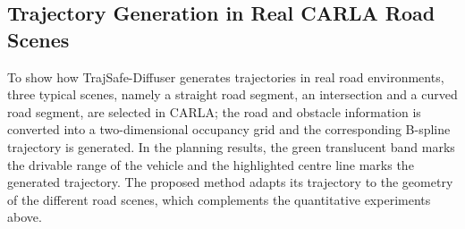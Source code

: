 \documentclass[journal]{IEEEtran}
\begin{document}
\subsection{Trajectory Generation in Real CARLA Road Scenes}
To show how TrajSafe-Diffuser generates trajectories in real road environments,
three typical scenes, namely a straight road segment, an intersection and a
curved road segment, are selected in CARLA; the road and obstacle information is
converted into a two-dimensional occupancy grid and the corresponding B-spline
trajectory is generated. In the planning results, the green translucent band
marks the drivable range of the vehicle and the highlighted centre line marks the
generated trajectory. The proposed method adapts its trajectory to the geometry
of the different road scenes, which complements the quantitative experiments
above.

\end{document}
